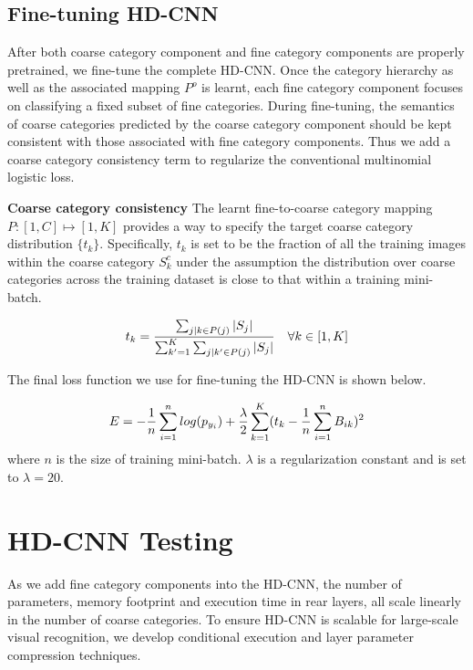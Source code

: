 \documentclass[10pt,twocolumn,letterpaper]{article}
\begin{document}
\subsection{Fine-tuning HD-CNN}
\label{sec:finetune_hdcnn}
After both coarse category component and fine category components are properly pretrained, we fine-tune the complete HD-CNN. Once the category hierarchy as well as the associated mapping $P^o$ is learnt, each fine category component focuses on classifying a fixed subset of fine categories. During fine-tuning, the semantics of coarse categories predicted by the coarse category component should be kept consistent with those associated with fine category components. Thus we add a coarse category consistency term to regularize the conventional multinomial logistic loss.

\noindent \textbf{Coarse category consistency} The learnt fine-to-coarse category mapping $P:[1,C] \mapsto [1,K]$ provides a way to specify the target coarse category distribution $\{t_{k}\}$. Specifically, $t_{k}$ is set to be the fraction of all the training images within the coarse category $S^c_k$ under the assumption the distribution over coarse categories across the training dataset is close to that within a training mini-batch.

\vspace{-0.5em}
\begin{equation}
\vspace{-0.5em}
\label{eqn:target_sparsity}
t_{k}=\frac{\sum_{j| k \in P(j)} \left | S_j \right | }{\sum_{k' =1}^{K} \sum_{j| k' \in P(j)} \left | S_j \right |  } \quad  \forall k \in [1,K]
\end{equation}

The final loss function we use for fine-tuning the HD-CNN is shown below.

\vspace{-0.5em}
\begin{equation}
\vspace{-0.5em}
\label{eqn:loss_function}
E=-\frac{1}{n}\sum_{i=1}^{n}log(p_{y_i})+ \frac{\lambda}{2}\sum_{k=1}^{K}(t_{k}-\frac{1}{n}\sum_{i=1}^{n}B_{ik})^2
\end{equation}
where $n$ is the size of training mini-batch. $\lambda$ is a regularization constant and is set to $\lambda=20$.  




\section{HD-CNN Testing}
\label{sec:hdcnn_testing}
As we add fine category components into the HD-CNN, the number of parameters, memory footprint and  execution time in rear layers,  all scale linearly in the number of coarse categories. 
To ensure HD-CNN is scalable for large-scale visual recognition, we develop conditional execution and layer parameter compression techniques.
\end{document}
